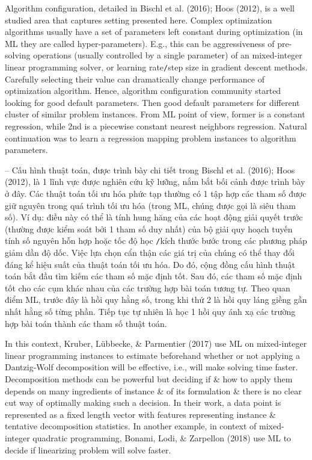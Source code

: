 \documentclass{article}
\begin{document}
\begin{itemize}
\begin{itemize}
\begin{itemize}
            Algorithm configuration, detailed in Bischl et al. (2016); Hoos (2012), is a well studied area that captures setting presented here. Complex optimization algorithms usually have a set of parameters left constant during optimization (in ML they are called hyper-parameters). E.g., this can be aggressiveness of pre-solving operations (usually controlled by a single parameter) of an mixed-integer linear programming solver, or learning rate{\tt/}step size in gradient descent methods. Carefully selecting their value can dramatically change performance of optimization algorithm. Hence, algorithm configuration community started looking for good default parameters. Then good default parameters for different cluster of similar problem instances. From ML point of view, former is a constant regression, while 2nd is a piecewise constant nearest neighbors regression. Natural continuation was to learn a regression mapping problem instances to algorithm parameters.

            -- Cấu hình thuật toán, được trình bày chi tiết trong Bischl et al. (2016); Hoos (2012), là 1 lĩnh vực được nghiên cứu kỹ lưỡng, nắm bắt bối cảnh được trình bày ở đây. Các thuật toán tối ưu hóa phức tạp thường có 1 tập hợp các tham số được giữ nguyên trong quá trình tối ưu hóa (trong ML, chúng được gọi là siêu tham số). Ví dụ: điều này có thể là tính hung hăng của các hoạt động giải quyết trước (thường được kiểm soát bởi 1 tham số duy nhất) của bộ giải quy hoạch tuyến tính số nguyên hỗn hợp hoặc tốc độ học {\tt/}kích thước bước trong các phương pháp giảm dần độ dốc. Việc lựa chọn cẩn thận các giá trị của chúng có thể thay đổi đáng kể hiệu suất của thuật toán tối ưu hóa. Do đó, cộng đồng cấu hình thuật toán bắt đầu tìm kiếm các tham số mặc định tốt. Sau đó, các tham số mặc định tốt cho các cụm khác nhau của các trường hợp bài toán tương tự. Theo quan điểm ML, trước đây là hồi quy hằng số, trong khi thứ 2 là hồi quy láng giềng gần nhất hằng số từng phần. Tiếp tục tự nhiên là học 1 hồi quy ánh xạ các trường hợp bài toán thành các tham số thuật toán.

            In this context, Kruber, Lübbecke, \& Parmentier (2017) use ML on mixed-integer linear programming instances to estimate beforehand whether or not applying a Dantzig-Wolf decomposition will be effective, i.e., will make solving time faster. Decomposition methods can be powerful but deciding if \& how to apply them depends on many ingredients of instance \& of its formulation \& there is no clear cut way of optimally making such a decision. In their work, a data point is represented as a fixed length vector with features representing instance \& tentative decomposition statistics. In another example, in context of mixed-integer quadratic programming, Bonami, Lodi, \& Zarpellon (2018) use ML to decide if linearizing problem will solve faster.


\end{itemize}
\end{itemize}
\end{itemize}
\end{document}
